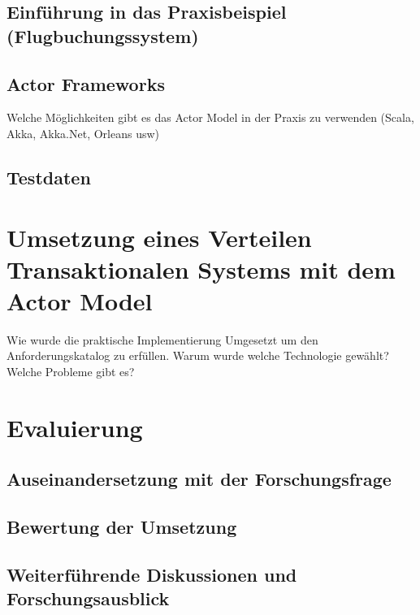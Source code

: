 \section{Einführung in das Praxisbeispiel (Flugbuchungssystem)}

\section{Actor Frameworks}\label{sec:ActorFrameworks}
Welche Möglichkeiten gibt es das Actor Model in der Praxis zu verwenden (Scala, Akka, Akka.Net, Orleans usw)

\section{Testdaten}

\chapter{Umsetzung eines Verteilen Transaktionalen Systems mit dem Actor Model}\label{cha:practicalDevelopment}
Wie wurde die praktische Implementierung Umgesetzt um den Anforderungskatalog zu erfüllen. Warum wurde welche Technologie gewählt? Welche Probleme gibt es? 

\chapter{Evaluierung} \label{cha:evaluation}
\section{Auseinandersetzung mit der Forschungsfrage}
\section{Bewertung der Umsetzung}
\section{Weiterführende Diskussionen und Forschungsausblick}
